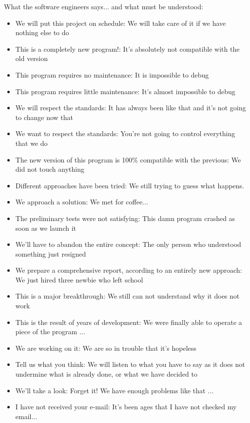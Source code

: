 What the software engineers says... and what must be understood:
\begin{itemize}
	\item We will put this project on schedule: We will take care of it if we have nothing else to do

	\item This is a completely new program!: It's absolutely not compatible with the old version

	\item This program requires no maintenance: It is impossible to debug

	\item This program requires little maintenance: It's almost impossible to debug

	\item We will respect the standards: It has always been like that and it's not going to change now that

	\item We want to respect the standards: You're not going to control everything that we do

	\item The new version of this program is 100\% compatible with the previous: We did not touch anything

	\item Different approaches have been tried: We still trying to guess what happens.

	\item We approach a solution: We met for coffee...

	\item The preliminary tests were not satisfying: This damn program crashed as soon as we launch it

	\item We'll have to abandon the entire concept: The only person who understood something just resigned

	\item We prepare a comprehensive report, according to an entirely new approach: We just hired three newbie who left school

	\item This is a major breakthrough: We still can not understand why it does not work

	\item This is the result of years of development: We were finally able to operate a piece of the program ...

	\item We are working on it: We are so in trouble that it's hopeless

	\item Tell us what you think: We will listen to what you have to say as it does not undermine what is already done, or what we have decided to

	\item We'll take a look: Forget it! We have enough problems like that ...

	\item I have not received your e-mail: It's been ages that I have not checked my email...
\end{itemize}

